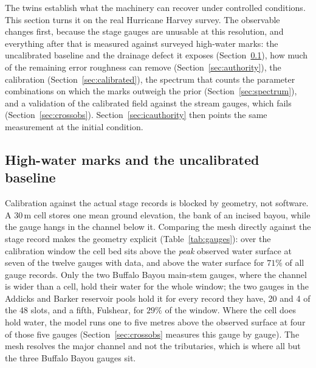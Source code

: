 \documentclass[11pt]{article}
\begin{document}
The twins establish what the machinery can recover under controlled
conditions. This section turns it on the real Hurricane Harvey survey.
The observable changes first, because the stage gauges are unusable
at this resolution, and everything after that is measured against
surveyed high-water marks: the uncalibrated baseline and the drainage
defect it exposes (Section~\ref{sec:hwm}), how much of the remaining
error roughness can remove (Section~\ref{sec:authority}), the
calibration (Section~\ref{sec:calibrated}), the spectrum that counts
the parameter combinations on which the marks outweigh the prior
(Section~\ref{sec:spectrum}), and a validation of the calibrated
field against the stream gauges, which fails
(Section~\ref{sec:crossobs}). Section~\ref{sec:icauthority} then
points the same measurement at the initial condition.

\subsection{High-water marks and the uncalibrated baseline}
\label{sec:hwm}

Calibration against the actual stage records is blocked by geometry,
not software. A 30\,m cell stores one mean ground elevation, the bank
of an incised bayou, while the gauge hangs in the channel below it.
Comparing the mesh directly against the stage record makes the
geometry explicit (Table~\ref{tab:gauges}): over the calibration
window the cell bed sits above the \emph{peak} observed water surface
at seven of the twelve gauges with data, and above the water surface
for $71\%$ of all gauge records. Only the two Buffalo Bayou main-stem
gauges, where the channel is wider than a cell, hold their water for
the whole window; the two gauges in the Addicks and Barker reservoir
pools hold it for every record they have, 20 and 4 of the 48 slots,
and a fifth, Fulshear, for $29\%$ of the window. Where the cell does
hold water, the model runs one to five metres above the observed
surface at four of those five gauges (Section~\ref{sec:crossobs}
measures this gauge by gauge). The mesh resolves the major channel and not the tributaries,
which is where all but the three Buffalo Bayou gauges sit.
\end{document}
